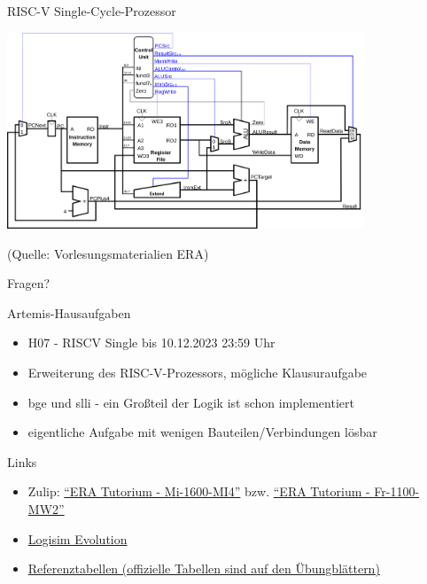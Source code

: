 \documentclass[
  german,            %
  aspectratio=169,    %
]{tumbeamer}
\begin{document}
\begin{frame}[c]{RISC-V Single-Cycle-Prozessor}{}
  \begin{center}
    \includegraphics[width=0.8\textwidth]{w07_single_cycle.png}
  \end{center}
  \centering
  \tiny (Quelle: Vorlesungsmaterialien ERA)
\end{frame}


\begin{frame}[c]{}{}
  \begin{center}
    \LARGE Fragen?
  \end{center}
\end{frame}

\begin{frame}[c, fragile]{Artemis-Hausaufgaben}{}
  \begin{itemize}
    \item H07 - RISCV Single bis 10.12.2023 23:59 Uhr
    \item Erweiterung des RISC-V-Prozessors, mögliche Klausuraufgabe
    \item bge und slli - ein Großteil der Logik ist schon implementiert
    \item eigentliche Aufgabe mit wenigen Bauteilen/Verbindungen lösbar
  \end{itemize}
\end{frame}

\begin{frame}[fragile, c]{Links}{}
  \begin{itemize}
    \item Zulip: \href{https://zulip.in.tum.de/#narrow/stream/1917-ERA-Tutorium---Mi-1600-MI4}{\enquote{ERA Tutorium - Mi-1600-MI4}}
    bzw. \href{https://zulip.in.tum.de/#narrow/stream/1940-ERA-Tutorium---Fr-1100-MW2}{\enquote{ERA Tutorium - Fr-1100-MW2}}
    \item \href{https://github.com/logisim-evolution/logisim-evolution/releases}{Logisim Evolution}
    \item \href{https://courses.edx.org/assets/courseware/v1/f06a2dc0c856f60ec0711e9f5e1c98cf/asset-v1:HarveyMuddX+ENGR85B+1T2023+type@asset+block/FinalReferences.pdf}{Referenztabellen (offizielle Tabellen sind auf den Übungblättern)}
  \end{itemize}
\end{frame}

\maketitle
\end{document}
